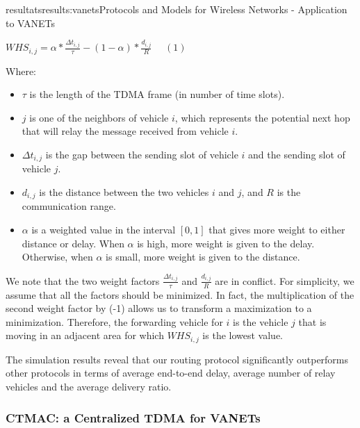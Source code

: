 \documentclass{ra2016}
\begin{document}
\begin{module}{resultats}{results:vanets}{Protocols and Models for Wireless Networks - Application to VANETs}
\begin{center}
\vspace{2mm}
$WHS_{i,j}=\alpha*\frac{\Delta t_{i,j}}{\tau}-(1-\alpha)*\frac{d_{i,j}}{R}~~~~~~(1)$ 
\vspace{2mm}
\end{center}
Where:
\begin{itemize}
\item $\tau$ is the length of the TDMA frame (in number of time slots).
\item $j$ is one of the neighbors of vehicle $i$, which represents the potential next hop that will relay the message 
received from vehicle $i$.
\item $\Delta t_{i,j}$ is the gap between the sending slot of vehicle $i$ and the sending slot of vehicle $j$.
\item $d_{i,j}$ is the distance between the two vehicles $i$ and $j$, and $R$ is the communication range. 
\item $\alpha$ is a weighted value in the interval $[0,1]$ that gives more weight to either distance or delay. When $\alpha$ is 
high, more weight is given to the delay. Otherwise, when $\alpha$ is small, more weight is given to the distance.
\end{itemize}
We note that the two weight factors $\frac{\Delta t_{i,j}}{\tau}$ and $\frac{d_{i,j}}{R}$ are in conflict. For simplicity, we assume 
that all the factors should be minimized. In fact, the multiplication of the second weight factor
by (-1) allows us to transform a maximization to a minimization. Therefore, the forwarding vehicle for $i$ is the 
vehicle $j$ that is moving in an adjacent area for which $WHS_{i,j}$ is the lowest value.


The simulation results reveal that our routing protocol significantly outperforms other
protocols in terms of average end-to-end delay, average number
of relay vehicles and the average delivery ratio.

\subsubsection{CTMAC: a Centralized TDMA for VANETs}

 \begin{participants}
\end{participants}
    

\end{module}
\end{document}
